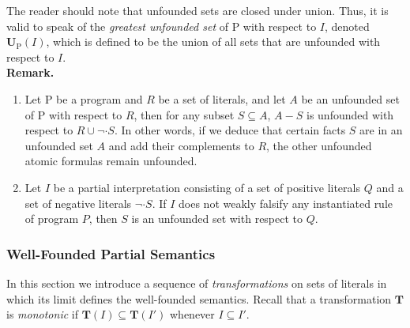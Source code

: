 The reader should note that unfounded sets are closed under union. Thus, it is valid to speak of the \emph{greatest unfounded set} of $\mathrm{P}$ with respect to $I$, denoted $\mathbf{U}_\mathrm{P}(I)$, which is defined to be the union of all sets that are unfounded with respect to $I$.
\medskip\\
\textbf{Remark.}
\begin{enumerate}[label=(\alph*)]
%
\item Let $\mathrm{P}$ be a program and $R$ be a set of literals, and let $A$ be an unfounded set of $\mathrm{P}$ with respect to $R$, then for any subset $S \subseteq A$, $A - S$ is unfounded with respect to $R \cup \neg \cdot S$. In other words, if we deduce that certain facts $S$ are in an unfounded set $A$ and add their complements to $R$, the other unfounded atomic formulas remain unfounded.
%
\item Let $I$ be a partial interpretation consisting of a set of positive literals $Q$ and a set of negative literals $\neg \cdot S$. If $I$ does not weakly falsify any instantiated rule of program $P$, then $S$ is an unfounded set with respect to $Q$.
%
\end{enumerate}

\subsubsection{Well-Founded Partial Semantics}
In this section we introduce a sequence of \emph{transformations} on sets of literals in which its limit defines the well-founded semantics. Recall that a transformation $\mathbf{T}$ is \emph{monotonic} if $\mathbf{T}(I) \subseteq \mathbf{T}(I')$ whenever $I \subseteq I'$.

